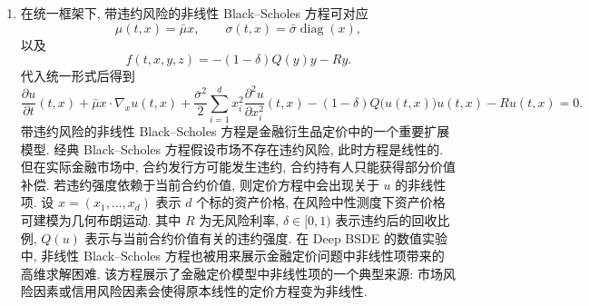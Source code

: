 \begin{enumerate}
        \item
        在统一框架下, 带违约风险的非线性 Black--Scholes 方程可对应
        \begin{equation*}
          \mu(t, x)= \bar{\mu}x, \qquad
          \sigma(t, x) = \bar{\sigma} \operatorname{diag}(x),
        \end{equation*}
        以及
        \begin{equation*}
          f(t, x, y, z) = - (1 - \delta) Q(y) y - R y.
        \end{equation*}
        代入统一形式后得到
        \begin{equation*}
          \frac{\partial u}{\partial t}(t, x)
          + \bar{\mu} x \cdot \nabla_{x} u(t, x)
          + \frac{\bar{\sigma}^{2}}{2}
          \sum_{i = 1}^{d} x_{i}^{2}
          \frac{\partial^{2} u}{\partial x_{i}^{2}}(t, x)
          - (1 - \delta) Q \big( u(t, x) \big) u(t, x)
          - R u(t, x)
          =0.
        \end{equation*}
        带违约风险的非线性 Black--Scholes 方程是金融衍生品定价中的一个重要扩展模型.
        经典 Black--Scholes 方程假设市场不存在违约风险, 此时方程是线性的.
        但在实际金融市场中, 合约发行方可能发生违约, 合约持有人只能获得部分价值补偿.
        若违约强度依赖于当前合约价值, 则定价方程中会出现关于 $u$ 的非线性项.
        设 $x=(x_{1}, \ldots, x_{d})$ 表示 $d$ 个标的资产价格, 在风险中性测度下资产价格可建模为几何布朗运动.
        其中 $R$ 为无风险利率, $\delta \in [0,1)$ 表示违约后的回收比例, $Q(u)$ 表示与当前合约价值有关的违约强度.
        在 Deep BSDE 的数值实验中, 非线性 Black--Scholes 方程也被用来展示金融定价问题中非线性项带来的高维求解困难\cite{hanSolvingHighdimensionalPartial2018}.
        该方程展示了金融定价模型中非线性项的一个典型来源: 市场风险因素或信用风险因素会使得原本线性的定价方程变为非线性.


\end{enumerate}
